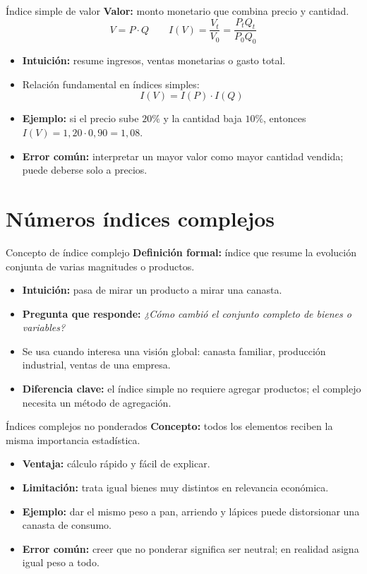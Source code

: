 \documentclass[aspectratio=169,11pt]{beamer}
\newcommand{\pregunta}[1]{\textbf{Pregunta que responde:} \emph{#1}}
\newcommand{\errorcomun}[1]{\textbf{Error común:} #1}
\newcommand{\diferencia}[1]{\textbf{Diferencia clave:} #1}
\newcommand{\intuicion}[1]{\textbf{Intuición:} #1}
\begin{document}
\begin{frame}{Índice simple de valor}
\textbf{Valor:} monto monetario que combina precio y cantidad.
\[
V=P\cdot Q \qquad I(V)=\frac{V_t}{V_0}=\frac{P_tQ_t}{P_0Q_0}
\]
\begin{itemize}
  \item \intuicion{resume ingresos, ventas monetarias o gasto total.}
  \item Relación fundamental en índices simples:
  \[
  I(V)=I(P)\cdot I(Q)
  \]
  \item \textbf{Ejemplo:} si el precio sube $20\%$ y la cantidad baja $10\%$, entonces $I(V)=1{,}20\cdot0{,}90=1{,}08$.
  \item \errorcomun{interpretar un mayor valor como mayor cantidad vendida; puede deberse solo a precios.}
\end{itemize}
\end{frame}

\section{Números índices complejos}

\begin{frame}{Concepto de índice complejo}
\textbf{Definición formal:} índice que resume la evolución conjunta de varias magnitudes o productos.
\begin{itemize}
  \item \intuicion{pasa de mirar un producto a mirar una canasta.}
  \item \pregunta{¿Cómo cambió el conjunto completo de bienes o variables?}
  \item Se usa cuando interesa una visión global: canasta familiar, producción industrial, ventas de una empresa.
  \item \diferencia{el índice simple no requiere agregar productos; el complejo necesita un método de agregación.}
\end{itemize}
\end{frame}

\begin{frame}{Índices complejos no ponderados}
\textbf{Concepto:} todos los elementos reciben la misma importancia estadística.
\begin{itemize}
  \item \textbf{Ventaja:} cálculo rápido y fácil de explicar.
  \item \textbf{Limitación:} trata igual bienes muy distintos en relevancia económica.
  \item \textbf{Ejemplo:} dar el mismo peso a pan, arriendo y lápices puede distorsionar una canasta de consumo.
  \item \errorcomun{creer que no ponderar significa ser neutral; en realidad asigna igual peso a todo.}
\end{itemize}
\end{frame}
\end{document}
